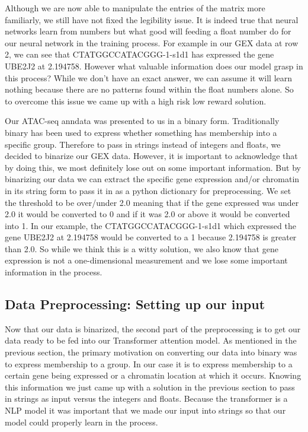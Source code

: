 Although we are now able to manipulate the entries of the matrix more familiarly, we still have not fixed the legibility issue. It is indeed true that neural networks learn from numbers but what good will feeding a float number do for our neural network in the training process. For example in our GEX data at row 2, we can see that CTATGGCCATACGGG-1-s1d1 has expressed the gene UBE2J2 at 2.194758. However what valuable information does our model grasp in this process? While we don't have an exact answer, we can assume it will learn nothing because there are no patterns found within the float numbers alone. So to overcome this issue we came up with a high risk low reward solution. 

Our ATAC-seq anndata was presented to us in a binary form. Traditionally binary has been used to express whether something has membership into a specific group. Therefore to pass in strings instead of integers and floats, we decided to binarize our GEX data. However, it is important to acknowledge that by doing this, we most definitely lose out on some important information. But by binarizing our data we can extract the specific gene expression and/or chromatin in its string form to pass it in as a python dictionary for preprocessing. We set the threshold to be over/under 2.0 meaning that if the gene expressed was under 2.0 it would be converted to 0 and if it was 2.0 or above it would be converted into 1. In our example, the CTATGGCCATACGGG-1-s1d1 which expressed the gene UBE2J2 at 2.194758 would be converted to a 1 because 2.194758 is greater than 2.0. So while we think this is a witty solution, we also know that gene expression is not a one-dimensional measurement and we lose some important information in the process. 

\subsection{Data Preprocessing: Setting up our input}

Now that our data is binarized, the second part of the preprocessing is to get our data ready to be fed into our Transformer attention model. As mentioned in the previous section, the primary motivation on converting our data into binary was to express membership to a group. In our case it is to express membership to a certain gene being expressed or a chromatin location at which it occurs. Knowing this information we just came up with a solution in the previous section to pass in strings as input versus the integers and floats. Because the transformer is a NLP model it was important that we made our input into strings so that our model could properly learn in the process. 

